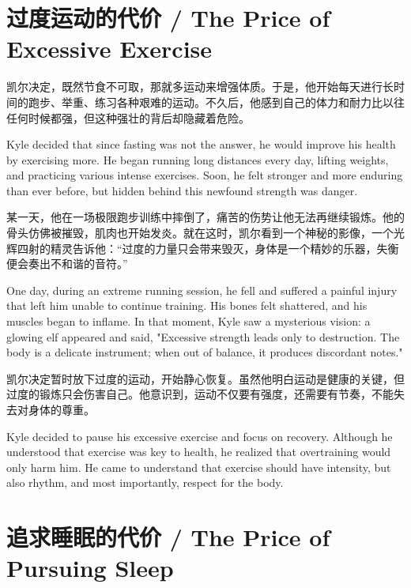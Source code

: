 \section*{过度运动的代价 / The Price of Excessive Exercise}

凯尔决定，既然节食不可取，那就多运动来增强体质。于是，他开始每天进行长时间的跑步、举重、练习各种艰难的运动。不久后，他感到自己的体力和耐力比以往任何时候都强，但这种强壮的背后却隐藏着危险。

\begin{flushright}
Kyle decided that since fasting was not the answer, he would improve his health by exercising more. He began running long distances every day, lifting weights, and practicing various intense exercises. Soon, he felt stronger and more enduring than ever before, but hidden behind this newfound strength was danger.
\end{flushright}

某一天，他在一场极限跑步训练中摔倒了，痛苦的伤势让他无法再继续锻炼。他的骨头仿佛被摧毁，肌肉也开始发炎。就在这时，凯尔看到一个神秘的影像，一个光辉四射的精灵告诉他：“过度的力量只会带来毁灭，身体是一个精妙的乐器，失衡便会奏出不和谐的音符。”

\begin{flushright}
One day, during an extreme running session, he fell and suffered a painful injury that left him unable to continue training. His bones felt shattered, and his muscles began to inflame. In that moment, Kyle saw a mysterious vision: a glowing elf appeared and said, "Excessive strength leads only to destruction. The body is a delicate instrument; when out of balance, it produces discordant notes."
\end{flushright}

凯尔决定暂时放下过度的运动，开始静心恢复。虽然他明白运动是健康的关键，但过度的锻炼只会伤害自己。他意识到，运动不仅要有强度，还需要有节奏，不能失去对身体的尊重。

\begin{flushright}
Kyle decided to pause his excessive exercise and focus on recovery. Although he understood that exercise was key to health, he realized that overtraining would only harm him. He came to understand that exercise should have intensity, but also rhythm, and most importantly, respect for the body.
\end{flushright}

\section*{追求睡眠的代价 / The Price of Pursuing Sleep}

